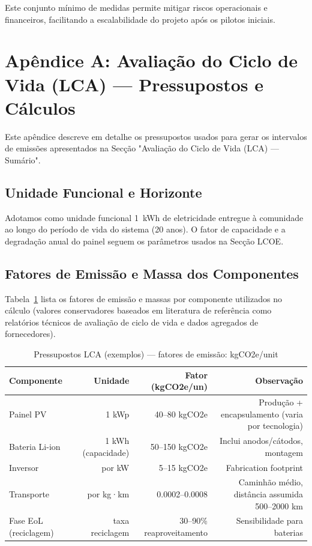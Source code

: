 \documentclass[12pt, a4paper]{article}
\begin{document}
\noindent Este conjunto mínimo de medidas permite mitigar riscos operacionais e financeiros,
facilitando a escalabilidade do projeto após os pilotos iniciais.

\clearpage
\appendix
\section{Apêndice A: Avaliação do Ciclo de Vida (LCA) — Pressupostos e Cálculos}
\label{app:lca}

Este apêndice descreve em detalhe os pressupostos usados para gerar os intervalos de
emissões apresentados na Secção "Avaliação do Ciclo de Vida (LCA) — Sumário".

\subsection{Unidade Funcional e Horizonte}
Adotamos como unidade funcional 1~kWh de eletricidade entregue à comunidade ao longo do
período de vida do sistema (20 anos). O fator de capacidade e a degradação anual do painel
seguem os parâmetros usados na Secção LCOE.

\subsection{Fatores de Emissão e Massa dos Componentes}
Tabela~\ref{tab:lca_assumptions} lista os fatores de emissão e massas por componente
utilizados no cálculo (valores conservadores baseados em literatura de referência como
relatórios técnicos de avaliação de ciclo de vida e dados agregados de fornecedores).

\begin{table}[H]
\centering
\caption{Pressupostos LCA (exemplos) — fatores de emissão: kgCO2e/unit}
\label{tab:lca_assumptions}
\footnotesize
\begin{tabular}{@{}lrrr@{}}
\toprule
\textbf{Componente} & \textbf{Unidade} & \textbf{Fator (kgCO2e/un)} & \textbf{Observação} \\
\midrule
Painel PV & 1 kWp & 40--80 kgCO2e & Produção + encapsulamento (varia por tecnologia) \\
Bateria Li-ion & 1 kWh (capacidade) & 50--150 kgCO2e & Inclui anodos/cátodos, montagem \\
Inversor & por kW & 5--15 kgCO2e & Fabrication footprint \\
Transporte & por kg·km & 0.0002--0.0008 & Caminhão médio, distância assumida 500--2000 km \\
Fase EoL (reciclagem) & taxa reciclagem & 30--90\% reaproveitamento & Sensibilidade para baterias \\
\bottomrule
\end{tabular}
\end{table}
\end{document}

